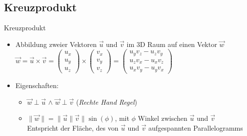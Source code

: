 \documentclass[10pt,aspectratio=169]{beamer}
\begin{document}
  \subsection{Kreuzprodukt}
  \begin{frame}{Kreuzprodukt}
    \begin{minipage}{10cm}
      \begin{itemize}
        \item Abbildung zweier Vektoren $\vec{u}$ und $\vec{v}$ im 3D Raum auf einen Vektor $\vec{w}$\\\vspace{0.25cm}
        \hspace{0.3cm}$\vec{w} = \vec{u} \times \vec{v} = \begin{pmatrix}u_x\\ u_y\\u_z\end{pmatrix} \times \begin{pmatrix}v_x\\v_y\\v_z\end{pmatrix} = \begin{pmatrix}u_yv_z - u_zv_y\\u_zv_x - u_xv_z\\u_xv_y - u_yv_x\end{pmatrix}$ 
        \vspace{0.25cm}
        \item Eigenschaften:
        \begin{itemize}
          \item $\vec{w} \perp \vec{u}$ \hspace{0.1cm}$\wedge$\hspace{0.1cm} $\vec{w} \perp \vec{v}$ (\textit{Rechte Hand Regel})
          \item $\|\vec{w}\| = \|\vec{u}\|\vec{v}\|\sin(\phi)$, mit $\phi$ Winkel zwischen $\vec{u}$ und $\vec{v}$\\
          Entspricht der Fläche, des von $\vec{u}$ und $\vec{v}$ aufgespannten Parallelogramms
        \end{itemize}
      \end{itemize}  
    \end{minipage}
    \begin{minipage}{3cm}
    \end{minipage}
  \end{frame}
\end{document}
